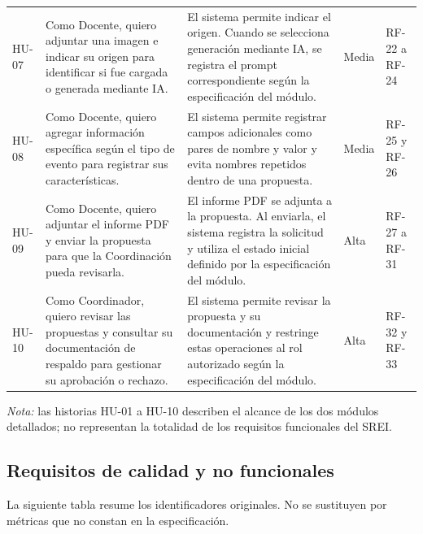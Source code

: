 \begin{longtable}{P{0.08\textwidth} P{0.30\textwidth} P{0.32\textwidth} P{0.08\textwidth} P{0.12\textwidth}}
HU-07 & Como Docente, quiero adjuntar una imagen e indicar su origen para identificar si fue cargada o generada mediante IA. & El sistema permite indicar el origen. Cuando se selecciona generación mediante IA, se registra el prompt correspondiente según la especificación del módulo. & Media & RF-22 a RF-24\\
HU-08 & Como Docente, quiero agregar información específica según el tipo de evento para registrar sus características. & El sistema permite registrar campos adicionales como pares de nombre y valor y evita nombres repetidos dentro de una propuesta. & Media & RF-25 y RF-26\\
HU-09 & Como Docente, quiero adjuntar el informe PDF y enviar la propuesta para que la Coordinación pueda revisarla. & El informe PDF se adjunta a la propuesta. Al enviarla, el sistema registra la solicitud y utiliza el estado inicial definido por la especificación del módulo. & Alta & RF-27 a RF-31\\
HU-10 & Como Coordinador, quiero revisar las propuestas y consultar su documentación de respaldo para gestionar su aprobación o rechazo. & El sistema permite revisar la propuesta y su documentación y restringe estas operaciones al rol autorizado según la especificación del módulo. & Alta & RF-32 y RF-33\\
\bottomrule
\end{longtable}

\noindent\textit{Nota:} las historias HU-01 a HU-10 describen el alcance de los dos módulos detallados; no representan la totalidad de los requisitos funcionales del SREI.

\subsection{Requisitos de calidad y no funcionales}
La siguiente tabla resume los identificadores originales. No se sustituyen por métricas que no constan en la especificación.

